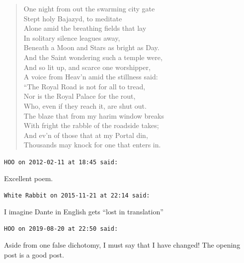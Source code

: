 \begin{footnotesize}
\begin{sffamily}
\begin{verse}
One night from out the swarming city gate\\
Stept holy Bajazyd, to meditate\\
Alone amid the breathing fields that lay\\
In solitary silence leagues away,\\
Beneath a Moon and Stars as bright as Day.\\
And the Saint wondering such a temple were,\\
And so lit up, and scarce one worshipper,\\
A voice from Heav'n amid the stillness said:\\
``The Royal Road is not for all to tread,\\
Nor is the Royal Palace for the rout,\\
Who, even if they reach it, are shut out.\\
The blaze that from my harim window breaks\\
With fright the rabble of the roadside takes;\\
And ev'n of those that at my Portal din,\\
Thousands may knock for one that enters in.
\end{verse}

\hfill

\texttt{HOO on 2012-02-11 at 18:45 said:}

Excellent poem.

\hfill

\texttt{White Rabbit on 2015-11-21 at 22:14 said:}

I imagine Dante in English gets ``lost in translation''

\hfill

\texttt{HOO on 2019-08-20 at 22:50 said:}

Aside from one false dichotomy, I must say that I have changed! The opening post is a good post.


\hfill

\end{sffamily}
\end{footnotesize}

